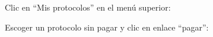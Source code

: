 \documentclass[12pt, spanish]{article}
\begin{document}
    \begin{steps}

        \item Clic en ``Mis protocolos'' en el menú superior:

            \medskip
            \begin{minipage}[t]{\linewidth}
            \raggedright
        \end{minipage}

        \item Escoger un protocolo sin pagar y clic en enlace ``pagar'':

            \medskip
            \begin{minipage}[t]{\linewidth}
            \raggedright
        \end{minipage}


\end{steps}
\end{document}
